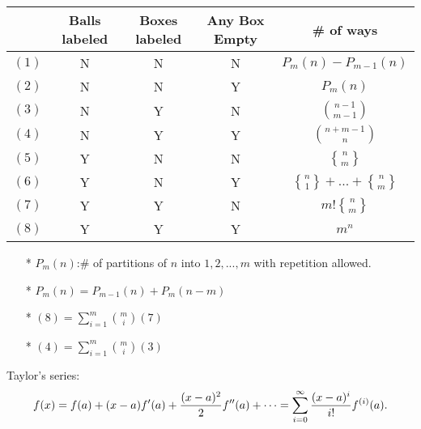 \documentclass[a4paper]{amsart}
\newcommand{\stirlingsecond}[2]{\genfrac{\{}{\}}{0pt}{}{#1}{#2}}
\begin{document}
      \begin{tabular}{|c|c|c|c|c|}
        \hline
         & Balls labeled & Boxes labeled & Any Box Empty & \# of ways \\ \hline
        $(1)$ & N & N & N & $P_m(n)-P_{m-1}(n)$ \\ \hline
        $(2)$ & N & N & Y & $P_m(n)$ \\ \hline
        $(3)$ & N & Y & N & $\binom{n-1}{m-1}$ \\ \hline
        $(4)$ & N & Y & Y & $\binom{n+m-1}{n}$ \\ \hline
        $(5)$ & Y & N & N & $\stirlingsecond{n}{m}$ \\ \hline
        $(6)$ & Y & N & Y & $\stirlingsecond{n}{1}+...+\stirlingsecond{n}{m}$ \\ \hline
        $(7)$ & Y & Y & N & $m!\stirlingsecond{n}{m}$ \\ \hline
        $(8)$ & Y & Y & Y & $m^n$ \\ \hline
      \end{tabular}
    \begin{enumerate}
    \item[*] $P_m(n)$:\# of partitions of $n$ into $1,2,...,m$ with repetition allowed.
    \item[*] $P_m(n)=P_{m-1}(n)+P_{m}(n-m)$
    \item[*] $(8)=\sum^m_{i=1}\binom{m}{i}(7)$
    \item[*] $(4)=\sum^m_{i=1}\binom{m}{i}(3)$
    \end{enumerate}
    Taylor's series:
$$
f(x) = f(a) + (x-a)f'(a) + {(x-a)^2 \over 2} f''(a) + \cdots = \sum_{i=0}^\infty {(x-a)^i \over i!} f^{(i)}(a).
$$




  \enlargethispage*{\baselineskip}
  \pagebreak

  




\end{document}
